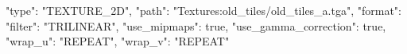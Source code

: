 {
	"type": "TEXTURE_2D",
	"path": "Textures:old_tiles/old_tiles_a.tga",
	"format": {
		"filter": "TRILINEAR",
		"use_mipmaps": true,
		"use_gamma_correction": true,
		"wrap_u": "REPEAT",
		"wrap_v": "REPEAT"
	}
}